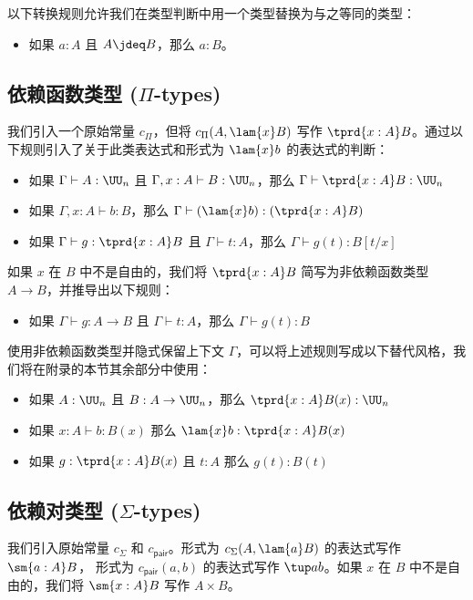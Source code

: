 以下转换规则允许我们在类型判断中用一个类型替换为与之等同的类型：
%
\begin{itemize}
  \item 如果 $a:A$ 且 $A \jdeq B$，那么 $a:B$。
\end{itemize}

\subsection{依赖函数类型 (\texorpdfstring{$\Pi$}{Π}-types)}

我们引入一个原始常量 $c_\Pi$，但将 $c_\Pi(A,\lam{x} B)$ 写作 $\tprd{x:A}B$。通过以下规则引入了关于此类表达式和形式为 $\lam{x} b$ 的表达式的判断：
%
\begin{itemize}
  \item 如果 $\Gamma \vdash A:\UU_n$ 且 $\Gamma,x:A \vdash B:\UU_n$，那么 $\Gamma \vdash \tprd{x:A}B : \UU_n$
  \item 如果 $\Gamma, x:A \vdash b:B$，那么 $\Gamma \vdash (\lam{x} b) : (\tprd{x:A} B)$
  \item 如果 $\Gamma\vdash g:\tprd{x:A} B$ 且 $\Gamma\vdash t:A$，那么 $\Gamma\vdash g(t):B[t/x]$
\end{itemize}
%
如果 $x$ 在 $B$ 中不是自由的，我们将 $\tprd{x:A} B$ 简写为非依赖函数类型 $A\rightarrow B$，并推导出以下规则：
%
\begin{itemize}
  \item 如果 $\Gamma\vdash g:A \rightarrow B$ 且 $\Gamma\vdash t:A$，那么 $\Gamma\vdash g(t):B$
\end{itemize}
使用非依赖函数类型并隐式保留上下文 $\Gamma$，可以将上述规则写成以下替代风格，我们将在附录的本节其余部分中使用：
%
\begin{itemize}
  \item 如果 $A:\UU_n$ 且 $B:A\to\UU_n$，那么 $\tprd{x:A}B(x) : \UU_n$
  \item 如果 $x:A \vdash b:B(x)$ 那么 $ \lam{x} b : \tprd{x:A} B(x)$
  \item 如果 $g:\tprd{x:A} B(x)$ 且 $t:A$ 那么 $g(t):B(t)$
\end{itemize}
%

\subsection{依赖对类型 (\texorpdfstring{$\Sigma$}{Σ}-types)}

我们引入原始常量 $c_\Sigma$ 和 $c_{\mathsf{pair}}$。形式为 $c_\Sigma(A,\lam{a} B)$ 的表达式写作 $\sm{a:A}B$，
形式为 $c_{\mathsf{pair}}(a,b)$ 的表达式写作 $\tup a b$。如果 $x$ 在 $B$ 中不是自由的，我们将 $\sm{x:A} B$ 写作 $A\times B$。


